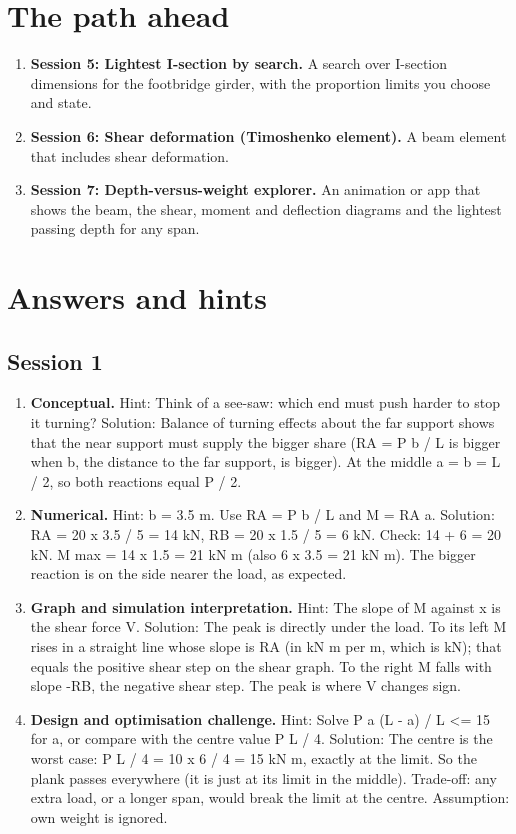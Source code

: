 \documentclass[11pt,a4paper]{article}
\begin{document}
\section{The path ahead}
\begin{enumerate}[nosep]
\item \textbf{Session 5: Lightest I-section by search.} A search over I-section dimensions for the footbridge girder, with the proportion limits you choose and state.
\item \textbf{Session 6: Shear deformation (Timoshenko element).} A beam element that includes shear deformation.
\item \textbf{Session 7: Depth-versus-weight explorer.} An animation or app that shows the beam, the shear, moment and deflection diagrams and the lightest passing depth for any span.
\end{enumerate}

\section{Answers and hints}

\subsection*{Session 1}
\begin{enumerate}[nosep]
\item \textbf{Conceptual.} Hint: Think of a see-saw: which end must push harder to stop it turning? Solution: Balance of turning effects about the far support shows that the near support must supply the bigger share (RA = P b / L is bigger when b, the distance to the far support, is bigger). At the middle a = b = L / 2, so both reactions equal P / 2.
\item \textbf{Numerical.} Hint: b = 3.5 m. Use RA = P b / L and M = RA a. Solution: RA = 20 x 3.5 / 5 = 14 kN, RB = 20 x 1.5 / 5 = 6 kN. Check: 14 + 6 = 20 kN. M max = 14 x 1.5 = 21 kN m (also 6 x 3.5 = 21 kN m). The bigger reaction is on the side nearer the load, as expected.
\item \textbf{Graph and simulation interpretation.} Hint: The slope of M against x is the shear force V. Solution: The peak is directly under the load. To its left M rises in a straight line whose slope is RA (in kN m per m, which is kN); that equals the positive shear step on the shear graph. To the right M falls with slope -RB, the negative shear step. The peak is where V changes sign.
\item \textbf{Design and optimisation challenge.} Hint: Solve P a (L - a) / L \textless{}= 15 for a, or compare with the centre value P L / 4. Solution: The centre is the worst case: P L / 4 = 10 x 6 / 4 = 15 kN m, exactly at the limit. So the plank passes everywhere (it is just at its limit in the middle). Trade-off: any extra load, or a longer span, would break the limit at the centre. Assumption: own weight is ignored.
\end{enumerate}
\end{document}
